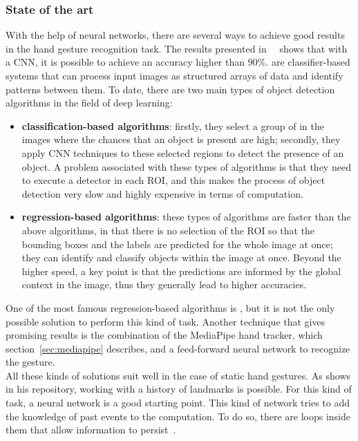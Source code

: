 \documentclass[../thesis.tex]{subfiles}
\begin{document}
\subsubsection{State of the art}
With the help of neural networks, there are several ways to achieve good results in the hand gesture recognition task. The results presented in~\citeauthor{paper:survey_on_vision_based_hand_gesture_recognition}~\cite{paper:survey_on_vision_based_hand_gesture_recognition} shows that with a \acrfull{CNN}, it is possible to achieve an accuracy higher than  $90\%$.  are classifier-based systems that can process input images as structured arrays of data and identify patterns between them. To date, there are two main types of object detection algorithms in the field of deep learning: 
\begin{itemize}
    \item \textbf{classification-based algorithms}: firstly, they select a group of  in the images where the chances that an object is present are high; secondly, they apply \acrshort{CNN} techniques to these selected regions to detect the presence of an object. A problem associated with these types of algorithms is that they need to execute a detector in each \acrshort{ROI}, and this makes the process of object detection very slow and highly expensive in terms of computation.
    \item \textbf{regression-based algorithms}: these types of algorithms are faster than the above algorithms, in that there is no selection of the \acrshort{ROI} so that the bounding boxes and the labels are predicted for the whole image at once; they can identify and classify objects within the image at once. Beyond the higher speed, a key point is that the predictions are informed by the global context in the image, thus they generally lead to higher accuracies.
\end{itemize}
One of the most famous regression-based algorithms is , but it is not the only possible solution to perform this kind of task. Another technique that gives promising results is the combination of the MediaPipe hand tracker, which section~\ref{sec:mediapipe} describes, and a feed-forward neural network to recognize the gesture.\\ All these kinds of solutions suit well in the case of static hand gestures. As  \citeauthor{site:hand_gesture_base_repo} shows in his repository\cite{site:hand_gesture_base_repo}, working with a history of landmarks is possible. For this kind of task, a  neural network is a good starting point. This kind of network tries to add the knowledge of past events to the computation. To do so, there are loops inside them that allow information to persist~\cite{site:understanding_lstm_networks}.
\end{document}
